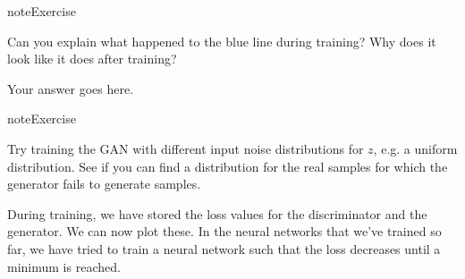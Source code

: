 \documentclass[letterpaper,10pt,english]{jupyterBook}
\begin{document}
\begin{sphinxadmonition}{note}{Exercise}

\sphinxAtStartPar
Can you explain what happened to the blue line during training? Why does it look like it does after training?
\end{sphinxadmonition}

\sphinxAtStartPar
Your answer goes here.

\begin{sphinxadmonition}{note}{Exercise}

\sphinxAtStartPar
Try training the GAN with different input noise distributions for \(z\), e.g. a uniform distribution. See if you can find a distribution for the real samples for which the generator fails to generate samples.
\end{sphinxadmonition}

\sphinxAtStartPar
During training, we have stored the loss values for the discriminator and the generator. We can now plot these. In the neural networks that we’ve trained so far, we have tried to train a neural network such that the loss decreases until a minimum is reached.
\end{document}
